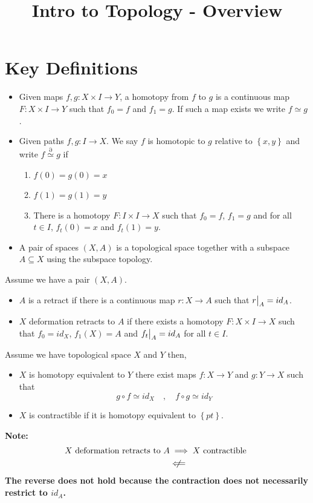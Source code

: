\documentclass[11pt]{article}
\title{Intro to Topology - Overview}
\author{}
\date{}
\newcommand{\homrel}{\stackrel{\partial}{\simeq}}
\newcommand\restr[2]{{%
  \left.\kern-\nulldelimiterspace %
  #1 %
  \vphantom{\big|} %
  \right|_{#2} %
  }}
\newenvironment{defin}
	{\begin{mdframed}[backgroundcolor=white, roundcorner=5pt, linewidth=1pt]}
	{\end{mdframed}}
\newcommand{\mdf}[1]{{\color{red} #1}}
\newenvironment{note}
	{\begin{mdframed}[backgroundcolor=white, linecolor=red, roundcorner=5pt, linewidth=1pt]\bfseries{Note:}\normalfont}
	{\end{mdframed}}
\begin{document}
\maketitle
\section{Key Definitions}
\begin{defin}
\begin{itemize}
	 \item Given maps $f,g:X\times I \to Y$, a \mdf{homotopy} from $f$ to $g$ is a continuous map  $F:X\times I \to Y$ such that $f_0=f$ and $f_1=g$.
		 If such a map exists we write $f\simeq g$.
	 \item Given paths $f,g:I \to X$. We say \mdf{$f$ is homotopic to $g$ relative to $\left\{x, y\right\}$} and write $f\homrel g$ if
		 \begin{enumerate}[label=(\roman*)]
			 \item $f(0)=g(0)=x$
			 \item $f(1)=g(1)=y$
			 \item There is a homotopy $F:I\times I \to X$ such that $f_0=f$, $f_1=g$ and for all $t\in I$, $f_t(0)=x$ and $f_t(1)=y$.
		 \end{enumerate}
	 \item A \mdf{pair} of spaces $(X,A)$ is a topological space together with a subspace $A\subseteq X$ using the subspace topology.
\end{itemize}
Assume we have a pair $(X,A)$.
\begin{itemize}
	 \item $A$ is a \mdf{retract} if there is a continuous map $r:X\to A$ such that $\restr{r}{A}=id_A$.
	 \item $X$ \mdf{deformation retracts} to $A$ if there exists a homotopy $F:X\times I \to X$ such that $f_0=id_X$, $f_1(X)=A$ and $\restr{f_t}{A}=id_A$ for all $t\in I$.
\end{itemize}
Assume we have topological space $X$ and $Y$ then,
\begin{itemize}
	\item $X$ is \mdf{homotopy equivalent} to $Y$ there exist maps $f:X\to Y$ and $g:Y\to X$ such that
	\[
g\circ f \simeq id_X \quad , \quad f\circ g \simeq id_Y
	\]
\item $X$ is \mdf{contractible} if it is homotopy equivalent to $\left\{pt\right\}$.
	
\end{itemize}
\end{defin}
\begin{note}
	\begin{align*}
		X \text{ deformation retracts to } A &\implies X \text{ contractible }\\
											 &\centernot\Longleftarrow
	\end{align*}
	The reverse does not hold because the contraction does not necessarily restrict to $id_A$.
\end{note}
\end{document}
